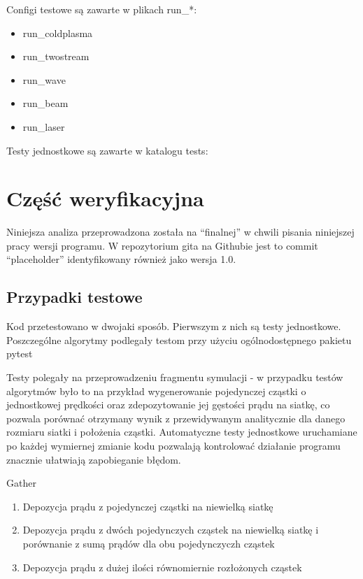 {    Configi testowe są zawarte w plikach run\_*: 
    \begin{itemize}
        \item run\_coldplasma
        \item run\_twostream
        \item run\_wave
        \item run\_beam
        \item run\_laser
    \end{itemize}

    Testy jednostkowe są zawarte w katalogu tests:



\section[Weryfikacja]{Część weryfikacyjna} %
    Niniejsza analiza przeprowadzona została na ``finalnej'' w chwili pisania niniejszej pracy wersji programu.
    W repozytorium gita na Githubie jest to commit ``placeholder'' 
    identyfikowany również jako wersja 1.0.

    \subsection{Przypadki testowe}

    Kod przetestowano w dwojaki sposób. Pierwszym z nich są testy jednostkowe.
    Poszczególne algorytmy podlegały testom przy użyciu ogólnodostępnego pakietu pytest 

    Testy polegały na przeprowadzeniu fragmentu symulacji - w przypadku testów algorytmów było to na przykład wygenerowanie
    pojedynczej cząstki o jednostkowej prędkości oraz zdepozytowanie jej gęstości prądu na siatkę, co pozwala porównać
    otrzymany wynik z przewidywanym analitycznie dla danego rozmiaru siatki i położenia cząstki. Automatyczne testy
    jednostkowe uruchamiane po każdej wymiernej zmianie kodu pozwalają kontrolować działanie programu znacznie ułatwiają
    zapobieganie błędom.

    \begin{enumerate}
        \itemi Gather
            \begin{enumerate}
                \item Depozycja prądu z pojedynczej cząstki na niewielką siatkę
                \item Depozycja prądu z dwóch pojedynczych cząstek na niewielką siatkę
                    i porównanie z sumą prądów dla obu pojedynczyczh cząstek
                \item Depozycja prądu z dużej ilości równomiernie rozłożonych cząstek
            \end{enumerate}


\end{enumerate}}
